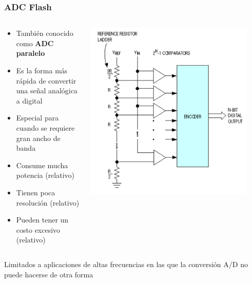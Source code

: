 \documentclass{beamer}
\begin{document}
\begin{frame}
\frametitle{ADC Flash}
\begin{columns}
\begin{column}{0.65\textwidth}
\begin{block}{}
\begin{itemize}
\item  También conocido como \textbf{ADC paralelo}
\item  \alert{Es la forma más rápida de convertir una señal analógica a
digital}
          \item  Especial para cuando se requiere gran ancho de banda 
          \item  Consume mucha potencia (relativo)
          \item  Tienen poca resolución (relativo)
          \item  Pueden tener un costo excesivo (relativo)
\end{itemize}
\end{block}
\end{column} 
\begin{column}{0.35\textwidth}
\includegraphics[height=0.5\textheight,width=0.9\textwidth]{d3/adc_flash}
\end{column}
\end{columns}
      \begin{alertblock}{}
          {\color{blue}Limitados a aplicaciones de altas frecuencias en las que
la conversión A/D no puede hacerse de otra forma}%
      \end{alertblock}
\end{frame}
\end{document}
